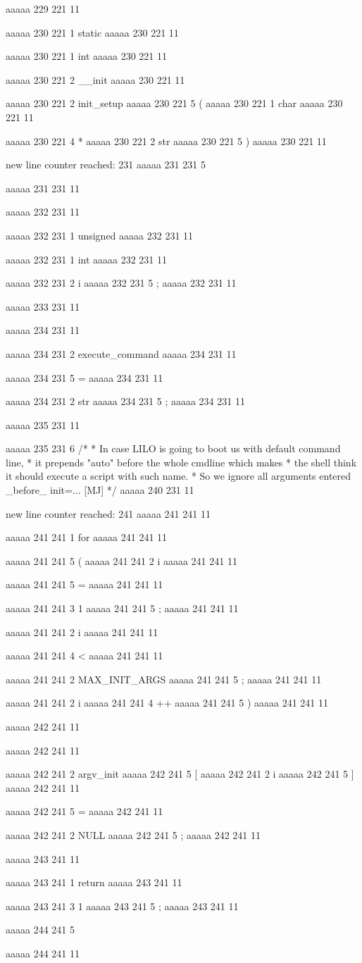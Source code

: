 aaaaa 229 221
11


aaaaa 230 221
1
static
aaaaa 230 221
11
 
aaaaa 230 221
1
int
aaaaa 230 221
11
 
aaaaa 230 221
2
__init
aaaaa 230 221
11
 
aaaaa 230 221
2
init_setup
aaaaa 230 221
5
(
aaaaa 230 221
1
char
aaaaa 230 221
11
 
aaaaa 230 221
4
*
aaaaa 230 221
2
str
aaaaa 230 221
5
)
aaaaa 230 221
11


new line counter reached: 231
aaaaa 231 231
5
{
aaaaa 231 231
11


aaaaa 232 231
11
	
aaaaa 232 231
1
unsigned
aaaaa 232 231
11
 
aaaaa 232 231
1
int
aaaaa 232 231
11
 
aaaaa 232 231
2
i
aaaaa 232 231
5
;
aaaaa 232 231
11


aaaaa 233 231
11


aaaaa 234 231
11
	
aaaaa 234 231
2
execute_command
aaaaa 234 231
11
 
aaaaa 234 231
5
=
aaaaa 234 231
11
 
aaaaa 234 231
2
str
aaaaa 234 231
5
;
aaaaa 234 231
11


aaaaa 235 231
11
	
aaaaa 235 231
6
/*
	 * In case LILO is going to boot us with default command line,
	 * it prepends "auto" before the whole cmdline which makes
	 * the shell think it should execute a script with such name.
	 * So we ignore all arguments entered _before_ init=... [MJ]
	 */
aaaaa 240 231
11


new line counter reached: 241
aaaaa 241 241
11
	
aaaaa 241 241
1
for
aaaaa 241 241
11
 
aaaaa 241 241
5
(
aaaaa 241 241
2
i
aaaaa 241 241
11
 
aaaaa 241 241
5
=
aaaaa 241 241
11
 
aaaaa 241 241
3
1
aaaaa 241 241
5
;
aaaaa 241 241
11
 
aaaaa 241 241
2
i
aaaaa 241 241
11
 
aaaaa 241 241
4
<
aaaaa 241 241
11
 
aaaaa 241 241
2
MAX_INIT_ARGS
aaaaa 241 241
5
;
aaaaa 241 241
11
 
aaaaa 241 241
2
i
aaaaa 241 241
4
++
aaaaa 241 241
5
)
aaaaa 241 241
11


aaaaa 242 241
11
	
aaaaa 242 241
11
	
aaaaa 242 241
2
argv_init
aaaaa 242 241
5
[
aaaaa 242 241
2
i
aaaaa 242 241
5
]
aaaaa 242 241
11
 
aaaaa 242 241
5
=
aaaaa 242 241
11
 
aaaaa 242 241
2
NULL
aaaaa 242 241
5
;
aaaaa 242 241
11


aaaaa 243 241
11
	
aaaaa 243 241
1
return
aaaaa 243 241
11
 
aaaaa 243 241
3
1
aaaaa 243 241
5
;
aaaaa 243 241
11


aaaaa 244 241
5
}
aaaaa 244 241
11


